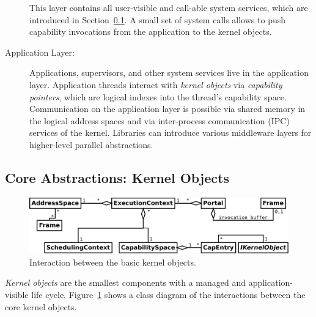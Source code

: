 \begin{description}
This layer contains all user-visible and call-able system services, which are introduced in Section~\ref{sec:kernel-objects}. A small set of system calls allows to push capability invocations from the application to the kernel objects.

\item[Application Layer:] Applications, supervisors, and other system services live in the application layer. Application threads interact with \emph{kernel objects} via \emph{capability pointers}, which are logical indexes into the thread's capability space. Communication on the application layer is possible via shared memory in the logical address spaces and via inter-process communication (IPC) services of the kernel. Libraries can introduce various middleware layers for higher-level parallel abstractions.
\end{description}

\subsection{Core Abstractions: Kernel Objects}
\label{sec:kernel-objects}

\begin{figure}
  \centering
  \includegraphics[scale=0.25]{fig/kernel-objects-logical.pdf}
  \caption{Interaction between the basic kernel objects.}
  \label{fig:kernel-objects-logical}
\end{figure}

\emph{Kernel objects} are the smallest components with a managed and application-visible life cycle. Figure~\ref{fig:kernel-objects-logical} shows a class diagram of the interactions between the core kernel objects. 

